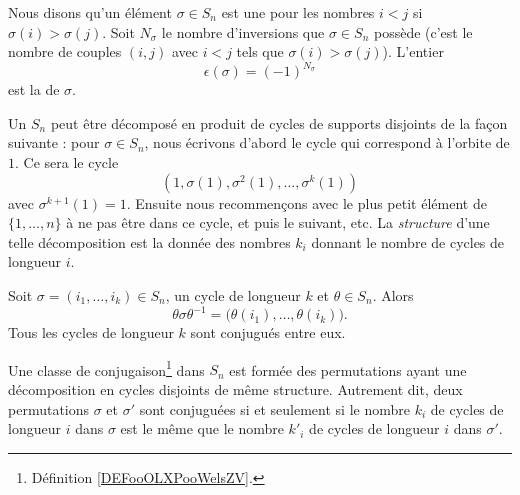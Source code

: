 \begin{definition}  \label{DEFooWPYSooPWuwWO}
    Nous disons qu'un élément \( \sigma \in S_n\) est une  pour les nombres \( i<j\) si \( \sigma(i)>\sigma(j)\). Soit \( N_\sigma\) le nombre d'inversions que \( \sigma\in S_n\) possède (c'est le nombre de couples \( (i,j)\) avec \( i<j\) tels que \( \sigma(i)>\sigma(j)\)). L'entier
    \begin{equation}
        \epsilon(\sigma)=(-1)^{N_\sigma}
    \end{equation}
    est la  de \( \sigma\).
\end{definition}

Un  \( S_n\) peut être décomposé en produit de cycles de supports disjoints de la façon suivante : pour \( \sigma \in S_n \), nous écrivons d'abord le cycle qui correspond à l'orbite de \( 1\). Ce sera le cycle
\begin{equation}
    (1,\sigma(1),\sigma^2(1),\ldots, \sigma^k(1))
\end{equation}
avec \( \sigma^{k+1}(1)=1\). Ensuite nous recommençons avec le plus petit élément de \( \{ 1,\ldots, n \}\) à ne pas être dans ce cycle, et puis le suivant, etc. La \emph{structure} d'une telle décomposition est la donnée des nombres \( k_i\) donnant le nombre de cycles de longueur \( i\).

\begin{lemma}        \label{LemmvZFWP}
    Soit \( \sigma=(i_1,\ldots, i_k)\in S_n\), un cycle de longueur \( k\) et \( \theta\in S_n\). Alors
    \begin{equation}
        \theta\sigma\theta^{-1}=\big( \theta(i_1),\ldots, \theta(i_k) \big).
    \end{equation}
    Tous les cycles de longueur \( k\) sont conjugués entre eux.
\end{lemma}

\begin{proposition} \label{PropEAHWXwe}
    Une classe de conjugaison\footnote{Définition \ref{DEFooOLXPooWelsZV}.} dans \( S_n\) est formée des permutations ayant une décomposition en cycles disjoints de même structure. Autrement dit, deux permutations \( \sigma\) et \( \sigma'\) sont conjuguées si et seulement si le nombre \( k_i\) de cycles de longueur \( i\) dans \( \sigma\) est le même que le nombre \( k'_i\) de cycles de longueur \( i\) dans \( \sigma'\).
\end{proposition}

